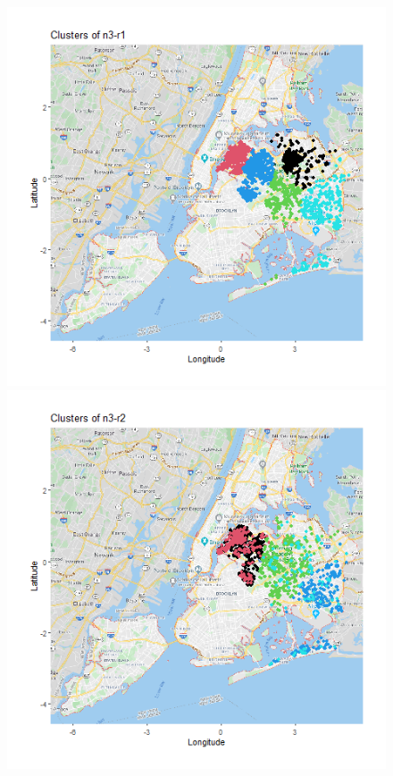 \documentclass{FR16}
\begin{document}
\begin{itemize}
\begin{figure}[!htb]
\begin{minipage}{0.33\textwidth}
   \end{minipage}\hfill
\begin{minipage}{0.33\textwidth}
     \centering
     \includegraphics[width=1\linewidth]{figures/clust-n3-r1.png} 
   \end{minipage}\hfill
   \begin{minipage}{0.33\textwidth}
     \centering
     \includegraphics[width=1\linewidth]{figures/clust-n3-r2.png}

\end{minipage}
\end{figure}
\end{itemize}
\end{document}
